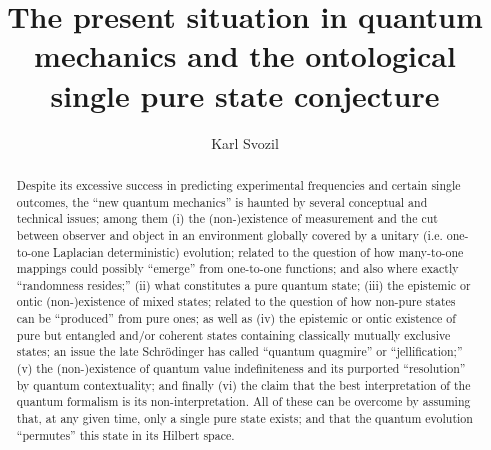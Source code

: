 \documentclass[%
 preprint,
 showpacs,
 showkeys,
 preprintnumbers,
 amsmath,amssymb,
 aps,
  pra,
  longbibliography,
 ]{revtex4-1}
\begin{document}
\title{The present situation in quantum mechanics and the ontological single pure state conjecture}


\author{Karl Svozil}
 



\begin{abstract}
Despite its excessive success in predicting experimental frequencies and certain single outcomes,
the ``new quantum mechanics'' is haunted by several conceptual and technical issues; among them
(i) the (non-)existence of measurement and the cut between observer and object in an environment globally covered by a unitary (i.e. one-to-one Laplacian deterministic) evolution;
related to the question of how many-to-one mappings could possibly ``emerge'' from one-to-one functions; and also where exactly ``randomness resides;''
(ii) what constitutes a pure quantum state;
(iii) the epistemic or ontic (non-)existence of mixed states; related to the question of how non-pure states can be ``produced'' from pure ones; as well as
(iv) the epistemic or ontic existence of pure but entangled and/or coherent states containing classically mutually exclusive states;
an issue the late Schr\"odinger has called ``quantum quagmire'' or ``jellification;''
(v) the (non-)existence of quantum value indefiniteness and its purported ``resolution'' by quantum contextuality; and finally
(vi) the claim that the best interpretation of the quantum formalism is its non-interpretation.
All of these can be overcome by assuming that, at any given time, only a single pure state exists;
and that the quantum evolution ``permutes'' this state in its Hilbert space.
\end{abstract}

\maketitle
\end{document}
